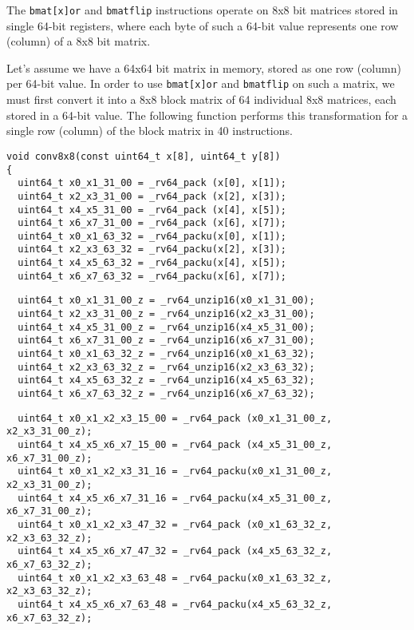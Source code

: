 The {\tt bmat[x]or} and {\tt bmatflip} instructions operate on 8x8 bit
matrices stored in single 64-bit registers, where each byte of such
a 64-bit value represents one row (column) of a 8x8 bit matrix.

Let's assume we have a 64x64 bit matrix in memory, stored as one row
(column) per 64-bit value. In order to use {\tt bmat[x]or} and
{\tt bmatflip} on such a matrix, we must first convert it into
a 8x8 block matrix of 64 individual 8x8 matrices, each stored in
a 64-bit value. The following function performs this transformation
for a single row (column) of the block matrix in 40 instructions.

\begin{minipage}{\linewidth}
\begin{verbatim}
void conv8x8(const uint64_t x[8], uint64_t y[8])
{
  uint64_t x0_x1_31_00 = _rv64_pack (x[0], x[1]);
  uint64_t x2_x3_31_00 = _rv64_pack (x[2], x[3]);
  uint64_t x4_x5_31_00 = _rv64_pack (x[4], x[5]);
  uint64_t x6_x7_31_00 = _rv64_pack (x[6], x[7]);
  uint64_t x0_x1_63_32 = _rv64_packu(x[0], x[1]);
  uint64_t x2_x3_63_32 = _rv64_packu(x[2], x[3]);
  uint64_t x4_x5_63_32 = _rv64_packu(x[4], x[5]);
  uint64_t x6_x7_63_32 = _rv64_packu(x[6], x[7]);
\end{verbatim}
\end{minipage}

\begin{minipage}{\linewidth}
\begin{verbatim}
  uint64_t x0_x1_31_00_z = _rv64_unzip16(x0_x1_31_00);
  uint64_t x2_x3_31_00_z = _rv64_unzip16(x2_x3_31_00);
  uint64_t x4_x5_31_00_z = _rv64_unzip16(x4_x5_31_00);
  uint64_t x6_x7_31_00_z = _rv64_unzip16(x6_x7_31_00);
  uint64_t x0_x1_63_32_z = _rv64_unzip16(x0_x1_63_32);
  uint64_t x2_x3_63_32_z = _rv64_unzip16(x2_x3_63_32);
  uint64_t x4_x5_63_32_z = _rv64_unzip16(x4_x5_63_32);
  uint64_t x6_x7_63_32_z = _rv64_unzip16(x6_x7_63_32);
\end{verbatim}
\end{minipage}

\begin{minipage}{\linewidth}
\begin{verbatim}
  uint64_t x0_x1_x2_x3_15_00 = _rv64_pack (x0_x1_31_00_z, x2_x3_31_00_z);
  uint64_t x4_x5_x6_x7_15_00 = _rv64_pack (x4_x5_31_00_z, x6_x7_31_00_z);
  uint64_t x0_x1_x2_x3_31_16 = _rv64_packu(x0_x1_31_00_z, x2_x3_31_00_z);
  uint64_t x4_x5_x6_x7_31_16 = _rv64_packu(x4_x5_31_00_z, x6_x7_31_00_z);
  uint64_t x0_x1_x2_x3_47_32 = _rv64_pack (x0_x1_63_32_z, x2_x3_63_32_z);
  uint64_t x4_x5_x6_x7_47_32 = _rv64_pack (x4_x5_63_32_z, x6_x7_63_32_z);
  uint64_t x0_x1_x2_x3_63_48 = _rv64_packu(x0_x1_63_32_z, x2_x3_63_32_z);
  uint64_t x4_x5_x6_x7_63_48 = _rv64_packu(x4_x5_63_32_z, x6_x7_63_32_z);
\end{verbatim}
\end{minipage}

